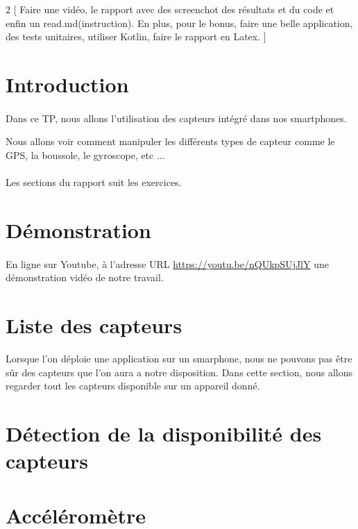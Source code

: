 \documentclass[a4paper]{article}
\begin{document}
    \newpage
    \begin{multicols}{2}
        [
            Faire une vidéo, le rapport avec des screenchot des résultats et du code et enfin un read.md(instruction). En plus, pour le bonus, faire une belle application, des tests unitaires, utiliser Kotlin, faire le rapport en Latex.
        ]
        \section*{Introduction}
        \paragraph{}
            Dans ce TP, nous allons l'utilisation des capteurs intégré dans nos smartphones.
            
            Nous allons voir comment manipuler les différents types de capteur comme le GPS, la boussole, le gyroscope, etc ...
        \paragraph{}
            Les sections du rapport suit les exercices.
        \section*{Démonstration}
            \paragraph{}
            En ligne sur Youtube, à l'adresse URL \url{https://youtu.be/nQUkpSUjJlY} une démonstration vidéo de notre travail.
        \section{Liste des capteurs}
            Lorsque l'on déploie une application sur un smarphone, nous ne pouvons pas être sûr des capteurs que l'on aura a notre disposition. Dans cette section, nous allons regarder tout les capteurs disponible sur un appareil donné.
        \section{Détection de la disponibilité des capteurs}  
        \section{Accéléromètre}

\end{multicols}
\end{document}
